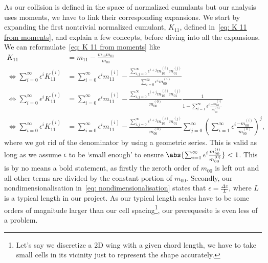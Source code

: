 As our collision is defined in the space of normalized cumulants but our analysis uses moments, we have to link their corresponding expansions.
We start by expanding the first nontrivial normalized cumulant, $K_{11}$, defined in~\eqref{eq: K 11 from moments}, and explain a few concepts, before diving into all the expansions.
We can reformulate~\eqref{eq: K 11 from moments} like
\begin{equation}
  \label{eq: first expansion}
  \begin{aligned}
    K_{11} & = m_{11} - \frac{m_{10}m_{01}}{m_{00}}\\
    \Leftrightarrow
    \sum_{i=0}^\infty \epsilon^i K_{11}^{(i)}
    & = \sum_{i=0}^\infty \epsilon^i m_{11}^{(i)} -
    \frac{\sum_{i,j=0}^\infty \epsilon^{i+j} m_{10}^{(i)}m_{01}^{(j)}}
        {\sum_{i=0}^\infty \epsilon^i m_{00}^{(i)}}\\
    \Leftrightarrow
    \sum_{i=0}^\infty \epsilon^i K_{11}^{(i)}
    & = \sum_{i=0}^\infty \epsilon^i m_{11}^{(i)} -
    \frac{\sum_{i,j=0}^\infty \epsilon^{i+j} m_{10}^{(i)}m_{01}^{(j)}}
        {m_{00}^{(0)}}
        \frac{1}{1 - \sum_{i=1}^\infty \epsilon^i \frac{ - m_{00}^{(i)}}{ m_{00}^{(0)}}}\\
    \Leftrightarrow
    \sum_{i=0}^\infty \epsilon^i K_{11}^{(i)}
    & = \sum_{i=0}^\infty \epsilon^i m_{11}^{(i)} -
    \frac{\sum_{i,j=0}^\infty \epsilon^{i+j} m_{10}^{(i)}m_{01}^{(j)}}
        {m_{00}^{(0)}}
    \sum_{j=0}^\infty {\left(\sum_{i=1}^\infty \epsilon^i \frac{ - m_{00}^{(i)}}{ m_{00}^{(0)}}\right)}^j,
  \end{aligned}
\end{equation}
where we got rid of the denominator by using a geometric series.
This is valid as long as we assume $\epsilon$ to be `small enough' to ensure $\abs{\sum_{i=1}^\infty \epsilon^i \frac{ m_{00}^{(i)}}{ m_{00}^{(0)}} } < 1$.
This is by no means a bold statement, as firstly the zeroth order of $m_{00}$ is left out and all other terms are divided by the constant portion of $m_{00}$.
Secondly, our nondimensionalisation in~\eqref{eq: nondimensionalisation} states that $\epsilon = \frac{\Delta x}{L}$, where $L$ is a typical length in our project.
As our typical length scales have to be some orders of magnitude larger than our cell spacing\footnote{Let's say we discretize a 2D wing with a given chord length, we have to take small cells in its vicinity just to represent the shape accurately.}, our prerequesite is even less of a problem.

